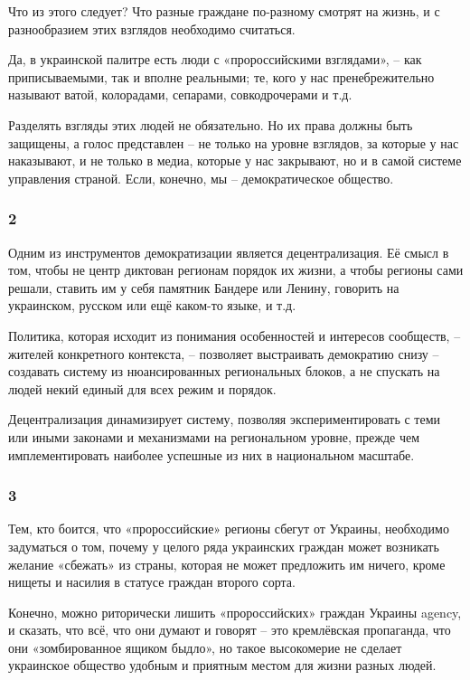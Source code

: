 Что из этого следует? Что разные граждане по-разному смотрят на жизнь, и с
разнообразием этих взглядов необходимо считаться. 

Да, в украинской палитре есть люди с «пророссийскими взглядами», – как
приписываемыми, так и вполне реальными; те, кого у нас пренебрежительно
называют ватой, колорадами, сепарами, совкодрочерами и т.д.

Разделять взгляды этих людей не обязательно. Но их права должны быть защищены,
а голос представлен – не только на уровне взглядов, за которые у нас
наказывают, и не только в медиа, которые у нас закрывают, но и в самой системе
управления страной. Если, конечно, мы – демократическое общество.

\subsubsection{2}

Одним из инструментов демократизации является децентрализация. Её смысл в том,
чтобы не центр диктован регионам порядок их жизни, а чтобы регионы сами решали,
ставить им у себя памятник Бандере или Ленину, говорить на украинском, русском
или ещё каком-то языке, и т.д.

Политика, которая исходит из понимания особенностей и интересов сообществ,
–жителей конкретного контекста, – позволяет выстраивать демократию снизу –
создавать систему из нюансированных региональных блоков, а не спускать на людей
некий единый для всех режим и порядок.

Децентрализация динамизирует систему, позволяя экспериментировать с теми или
иными законами и механизмами на региональном уровне, прежде чем
имплементировать наиболее успешные из них в национальном масштабе.

\subsubsection{3}

Тем, кто боится, что «пророссийские» регионы сбегут от Украины, необходимо
задуматься о том, почему у целого ряда украинских граждан может возникать
желание «сбежать» из страны, которая не может предложить им ничего, кроме
нищеты и насилия в статусе граждан второго сорта.

Конечно, можно риторически лишить «пророссийских» граждан Украины agency, и
сказать, что всё, что они думают и говорят – это кремлёвская пропаганда, что
они «зомбированное ящиком быдло», но такое высокомерие не сделает украинское
общество удобным и приятным местом для жизни разных людей.


